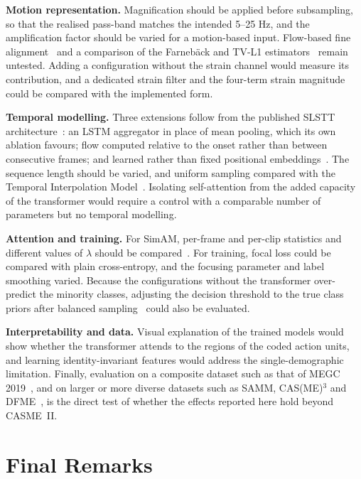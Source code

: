 \textbf{Motion representation.} Magnification should be applied before subsampling, so that the realised pass-band matches the intended 5--25 Hz, and the amplification factor should be varied for a motion-based input. Flow-based fine alignment~\cite{xu2017} and a comparison of the Farneb\"ack and TV-L1 estimators~\cite{zhaoS2021,liong2019a} remain untested. Adding a configuration without the strain channel would measure its contribution, and a dedicated strain filter and the four-term strain magnitude~\cite{liong2014a,liong2016} could be compared with the implemented form.

\textbf{Temporal modelling.} Three extensions follow from the published SLSTT architecture~\cite{zhang2022}: an LSTM aggregator in place of mean pooling, which its own ablation favours; flow computed relative to the onset rather than between consecutive frames; and learned rather than fixed positional embeddings~\cite{dosovitskiy2021}. The sequence length should be varied, and uniform sampling compared with the Temporal Interpolation Model~\cite{pfister2011}. Isolating self-attention from the added capacity of the transformer would require a control with a comparable number of parameters but no temporal modelling.

\textbf{Attention and training.} For SimAM, per-frame and per-clip statistics and different values of $\lambda$ should be compared~\cite{yang2021}. For training, focal loss could be compared with plain cross-entropy, and the focusing parameter and label smoothing varied. Because the configurations without the transformer over-predict the minority classes, adjusting the decision threshold to the true class priors after balanced sampling~\cite{buda2018} could also be evaluated.

\textbf{Interpretability and data.} Visual explanation of the trained models would show whether the transformer attends to the regions of the coded action units, and learning identity-invariant features would address the single-demographic limitation. Finally, evaluation on a composite dataset such as that of MEGC 2019~\cite{see2019}, and on larger or more diverse datasets such as SAMM, CAS(ME)$^3$ and DFME~\cite{davison2018,li2023casme3,zhao2024dfme}, is the direct test of whether the effects reported here hold beyond CASME~II.


\section{Final Remarks}
\label{sec:final-remarks}


